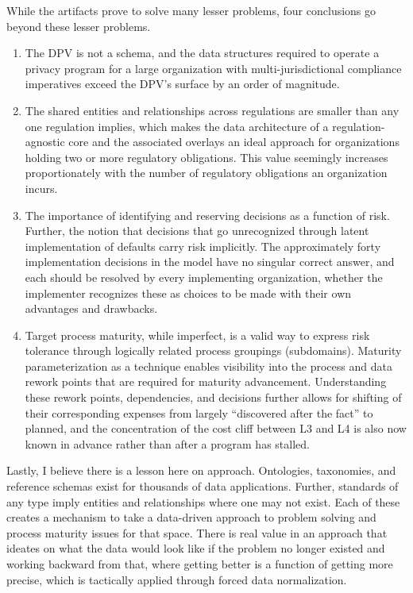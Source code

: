\documentclass[10pt,letterpaper,twocolumn,twoside]{rho-class/rho}
\begin{document}
While the artifacts prove to solve many lesser problems, four conclusions go beyond these lesser problems.

\begin{enumerate}
    \item The DPV is not a schema, and the data structures required to operate a privacy program for a large organization with multi-jurisdictional compliance imperatives exceed the DPV's surface by an order of magnitude.
    \item The shared entities and relationships across regulations are smaller than any one regulation implies, which makes the data architecture of a regulation-agnostic core and the associated overlays an ideal approach for organizations holding two or more regulatory obligations. This value seemingly increases proportionately with the number of regulatory obligations an organization incurs.
    \item The importance of identifying and reserving decisions as a function of risk. Further, the notion that decisions that go unrecognized through latent implementation of defaults carry risk implicitly. The approximately forty implementation decisions in the model have no singular correct answer, and each should be resolved by every implementing organization, whether the implementer recognizes these as choices to be made with their own advantages and drawbacks.
    \item Target process maturity, while imperfect, is a valid way to express risk tolerance through logically related process groupings (subdomains). Maturity parameterization as a technique enables visibility into the process and data rework points that are required for maturity advancement. Understanding these rework points, dependencies, and decisions further allows for shifting of their corresponding expenses from largely ``discovered after the fact'' to planned, and the concentration of the cost cliff between L3 and L4 is also now known in advance rather than after a program has stalled. 

    
\end{enumerate}

Lastly, I believe there is a lesson here on approach. Ontologies, taxonomies, and reference schemas exist for thousands of data applications. Further, standards of any type imply entities and relationships where one may not exist. Each of these creates a mechanism to take a data-driven approach to problem solving and process maturity issues for that space. There is real value in an approach that ideates on what the data would look like if the problem no longer existed and working backward from that, where getting better is a function of getting more precise, which is tactically applied through forced data normalization.
\clearpage
\end{document}
